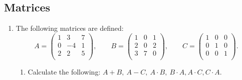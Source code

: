 \if{}\fi

			\subsection{Matrices}
			\begin{enumerate}
				\item The following matrices are defined:
					\begin{equation*}
						A =
						\begin{pmatrix}
							1 & 3  & 7\\
							0 & -4 & 1\\
							2 & 2  & 5\\
						\end{pmatrix},
						\qquad
						B =
						\begin{pmatrix}
							1 & 0 & 1\\
							2 & 0 & 2\\
							3 & 7 & 0\\
						\end{pmatrix},
						\qquad
						C =
						\begin{pmatrix}
							1 & 0 & 0\\
							0 & 1 & 0\\
							0 & 0 & 1\\
						\end{pmatrix}.
					\end{equation*}
					\begin{enumerate}
						\item Calculate the following: $A+B,\ A-C,\ A\cdot B,\ B\cdot A, A\cdot C, C\cdot A$.
							\if{}
\end{enumerate}
\end{enumerate}
